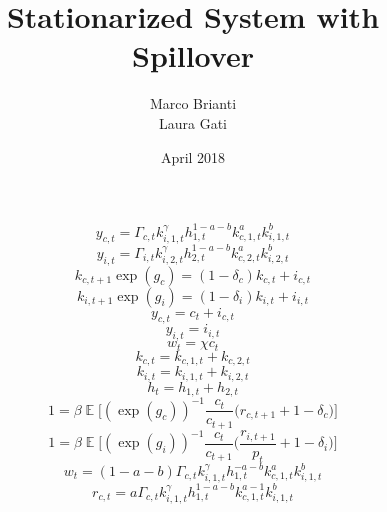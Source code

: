 \documentclass{article}
\title{Stationarized System with Spillover}
\author{Marco Brianti\\Laura Gati}
\date{April 2018}
\DeclareMathOperator{\E}{\mathbb{E}}
\begin{document}
	
	\maketitle

\Large{
	

\begin{equation}
y_{c,t} = \Gamma_{c,t} k_{i,1,t}^{\gamma} h_{1,t}^{1 - a- b} k_{c,1,t}^a k_{i,1,t}^b
\end{equation}
\begin{equation}
y_{i,t} = \Gamma_{i,t} k_{i,2,t}^{\gamma} h_{2,t}^{1 - a- b} k_{c,2,t}^a k_{i,2,t}^b
\end{equation}
\begin{equation}
k_{c,t+1} \exp{(g_c)} = (1 - \delta_c)k_{c,t} + i_{c,t}
\end{equation}
\begin{equation}
k_{i,t+1} \exp{(g_i)} = (1 - \delta_i)k_{i,t} + i_{i,t}
\end{equation}
\begin{equation}
y_{c,t} = c_{t} + i_{c,t}
\end{equation}
\begin{equation}
y_{i,t} = i_{i,t}
\end{equation}
\begin{equation}
w_{t} = \chi c_{t}
\end{equation}
\begin{equation}
k_{c,t} = k_{c,1,t} + k_{c,2,t}
\end{equation}
\begin{equation}
k_{i,t} = k_{i,1,t} + k_{i,2,t}
\end{equation}
\begin{equation}
h_{t} = h_{1,t} + h_{2,t}
\end{equation}
\begin{equation}
1 = \beta \E \bigg[ (\exp{(g_c)})^{-1} \frac{c_{t}}{c_{t+1}} \bigg( r_{c,t+1} + 1 - \delta_c   \bigg)     \bigg]
\end{equation}
\begin{equation}
1 = \beta \E \bigg[ (\exp{(g_i)})^{-1} \frac{c_{t}}{c_{t+1}} \bigg( \frac{r_{i,t+1}}{p_t} + 1 - \delta_i  \bigg)     \bigg]
\end{equation}
\begin{equation}
w_t = (1 - a - b)\Gamma_{c,t} k_{i,1,t}^{\gamma} h_{1,t}^{- a- b} k_{c,1,t}^a k_{i,1,t}^b
\end{equation}
\begin{equation}
r_{c,t} = a \Gamma_{c,t} k_{i,1,t}^{\gamma} h_{1,t}^{1 - a- b} k_{c,1,t}^{a-1} k_{i,1,t}^b

\end{equation}}
\end{document}
